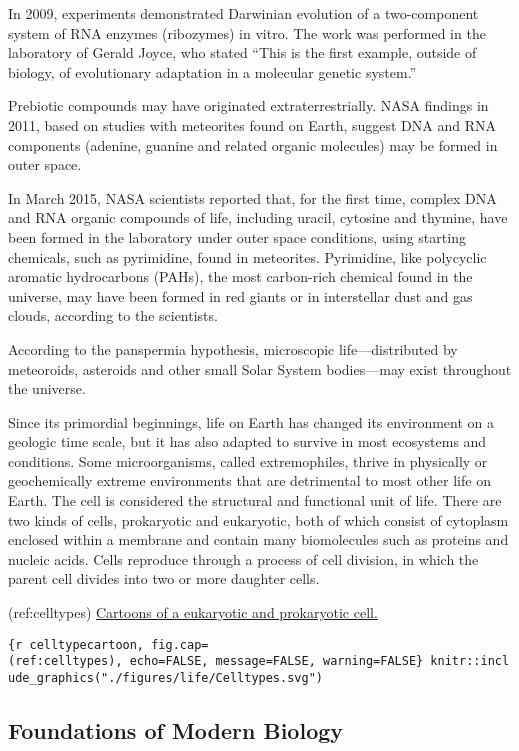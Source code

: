 \documentclass[
]{article}
\begin{document}
In 2009, experiments demonstrated Darwinian evolution of a two-component
system of RNA enzymes (ribozymes) in vitro. The work was performed in
the laboratory of Gerald Joyce, who stated ``This is the first example,
outside of biology, of evolutionary adaptation in a molecular genetic
system.''

Prebiotic compounds may have originated extraterrestrially. NASA
findings in 2011, based on studies with meteorites found on Earth,
suggest DNA and RNA components (adenine, guanine and related organic
molecules) may be formed in outer space.

In March 2015, NASA scientists reported that, for the first time,
complex DNA and RNA organic compounds of life, including uracil,
cytosine and thymine, have been formed in the laboratory under outer
space conditions, using starting chemicals, such as pyrimidine, found in
meteorites. Pyrimidine, like polycyclic aromatic hydrocarbons (PAHs),
the most carbon-rich chemical found in the universe, may have been
formed in red giants or in interstellar dust and gas clouds, according
to the scientists.

According to the panspermia hypothesis, microscopic life---distributed
by meteoroids, asteroids and other small Solar System bodies---may exist
throughout the universe.

Since its primordial beginnings, life on Earth has changed its
environment on a geologic time scale, but it has also adapted to survive
in most ecosystems and conditions. Some microorganisms, called
extremophiles, thrive in physically or geochemically extreme
environments that are detrimental to most other life on Earth. The cell
is considered the structural and functional unit of life. There are two
kinds of cells, prokaryotic and eukaryotic, both of which consist of
cytoplasm enclosed within a membrane and contain many biomolecules such
as proteins and nucleic acids. Cells reproduce through a process of cell
division, in which the parent cell divides into two or more daughter
cells.

(ref:celltypes)
\href{https://commons.wikimedia.org/wiki/File:Celltypes.svg}{Cartoons of
a eukaryotic and prokaryotic cell.}

\texttt{\{r\ celltypecartoon,\ fig.cap=\textquotesingle{}(ref:celltypes)\textquotesingle{},\ echo=FALSE,\ message=FALSE,\ warning=FALSE\}\ knitr::include\_graphics("./figures/life/Celltypes.svg")}

\hypertarget{foundations-of-modern-biology}{%
\subsection{Foundations of Modern
Biology}\label{foundations-of-modern-biology}}
\end{document}
